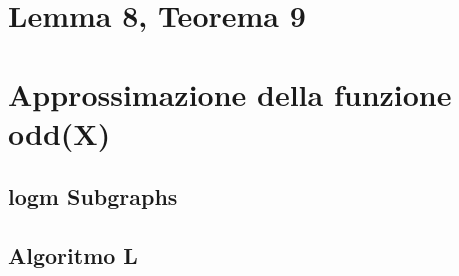 \section{Lemma 8, Teorema 9}

\section{Approssimazione della funzione odd(X)}
\subsection{logm Subgraphs}
\subsection{Algoritmo L}
